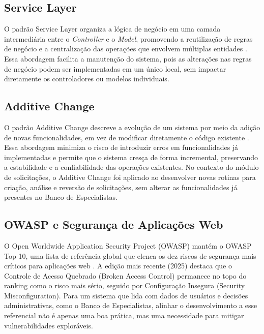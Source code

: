 \subsection{Service Layer}
\label{subsec:service-layer}
O padrão Service Layer organiza a lógica de negócio em uma camada intermediária entre
o \textit{Controller} e o \textit{Model}, promovendo a reutilização de regras de negócio
e a centralização das operações que envolvem múltiplas entidades \cite{fowler2002}. Essa
abordagem facilita a manutenção do sistema, pois as alterações nas regras de negócio
podem ser implementadas em um único local, sem impactar diretamente os controladores
ou modelos individuais.



\subsection{Additive Change}
\label{subsec:additive-change}

O padrão Additive Change descreve a evolução de um sistema por meio da adição de novas
funcionalidades, em vez de modificar diretamente o código existente \cite{fowler2004}. Essa
abordagem minimiza o risco de introduzir erros em funcionalidades já implementadas e permite que
o sistema cresça de forma incremental, preservando a estabilidade e a confiabilidade das
operações existentes. No contexto do módulo de solicitações, o Additive Change foi aplicado ao
desenvolver novas rotinas para criação, análise e reversão de solicitações, sem alterar as
funcionalidades já presentes no Banco de Especialistas.

\subsection{OWASP e Segurança de Aplicações Web}
\label{subsec:owasp-seguranca-aplicacoes-web}
O Open Worldwide Application Security Project (OWASP) mantém o OWASP Top 10, uma lista
de referência global que elenca os dez riscos de segurança mais críticos para aplicações
web \cite{owasp2025}. A edição mais recente (2025) destaca que o Controle de Acesso Quebrado
(Broken Access Control) permanece no topo do ranking como o risco mais sério, seguido por
Configuração Insegura (Security Misconfiguration). Para um sistema que lida com dados de
usuários e decisões administrativas, como o Banco de Especialistas, alinhar o desenvolvimento
a esse referencial não é apenas uma boa prática, mas uma necessidade para mitigar
vulnerabilidades exploráveis.

